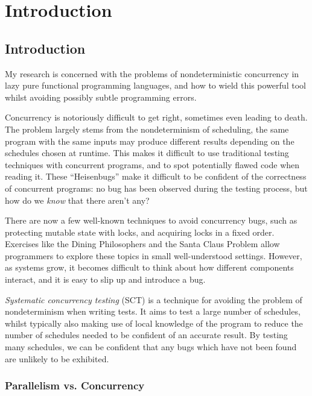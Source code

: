 \part{Introduction}


\chapter{Introduction}
\label{chp:intro}

My research is concerned with the problems of nondeterministic
concurrency in lazy pure functional programming languages, and how to
wield this powerful tool whilst avoiding possibly subtle programming
errors.

Concurrency is notoriously difficult to get right\cite{overrated},
sometimes even leading to death\cite{therac25}. The problem largely
stems from the nondeterminism of scheduling, the same program with the
same inputs may produce different results depending on the schedules
chosen at runtime. This makes it difficult to use traditional testing
techniques with concurrent programs, and to spot potentially flawed
code when reading it. These ``Heisenbugs'' make it difficult to be
confident of the correctness of concurrent programs: no bug has been
observed during the testing process, but how do we \textit{know} that
there aren't any?

There are now a few well-known techniques to avoid concurrency bugs,
such as protecting mutable state with locks, and acquiring locks in a
fixed order. Exercises like the Dining
Philosophers\cite{diningphilosophers} and the Santa Claus
Problem\cite{santaclaus} allow programmers to explore these topics in
small well-understood settings. However, as systems grow, it becomes
difficult to think about how different components interact, and it is
easy to slip up and introduce a bug.

\textit{Systematic concurrency testing} (SCT)\cite{pbound, dbound,
  empirical, heisenbugs} is a technique for avoiding the problem of
nondeterminism when writing tests. It aims to test a large number of
schedules, whilst typically also making use of local knowledge of the
program to reduce the number of schedules needed to be confident of an
accurate result. By testing many schedules, we can be confident that
any bugs which have not been found are unlikely to be exhibited.

\section{Parallelism vs. Concurrency}
\label{sec:intro-parconc}

